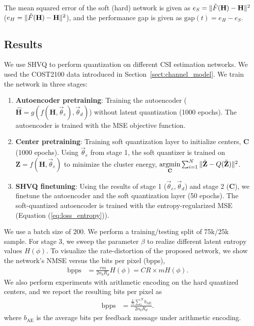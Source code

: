The mean squared error of the soft (hard) network is given as $e_S=\Arrowvert \tilde F(\mathbf H) - \mathbf H\Arrowvert^2$ ($e_H=\Arrowvert \hat F(\mathbf H) - \mathbf H\Arrowvert^2$), and the performance gap is given as $\text{gap}(t)=e_H - e_S$.

\subsection{Results}

We use SHVQ \cite{ref:Agustsson2017SoftToHard} to perform quantization on different CSI estimation networks. We used the COST2100 data introduced in Section~\ref{sect:channel_model}. We train the network in three stages:
\begin{enumerate}
	\item \textbf{Autoencoder pretraining}: Training the autoencoder ($\hat{\mathbf{H}}=g(f(\mathbf H, \vec\theta_e), \vec\theta_d)$) without latent quantization (1000 epochs). The autoencoder is trained with the MSE objective function.
	\item \textbf{Center pretraining}: Training soft quantization layer to initialize centers, $\mathbf C$ (1000 epochs). Using $\vec \theta_e$ from stage 1, the soft quantizer is trained on $\mathbf Z=f(\mathbf H, \vec \theta_e)$ to minimize the cluster energy, $\underset{\mathbf C}{\text{argmin}}\sum_{i=1}^N \Arrowvert \tilde{\mathbf Z} - Q(\tilde{\mathbf Z})\Arrowvert^2$.
	\item \textbf{SHVQ finetuning}: Using the results of stage 1 ($\vec\theta_e, \vec\theta_d$) and stage 2 ($\mathbf C$), we finetune the autoencoder and the soft quantization layer (50 epochs). The soft-quantized autoencoder is trained with the entropy-regularized MSE (Equation (\ref{eq:loss_entropy})).
\end{enumerate}

We use a batch size of 200. We perform a training/testing split of 75k/25k sample. For stage 3, we sweep the parameter $\beta$ to realize different latent entropy values $H(\phi)$. To visualize the rate-distortion of the proposed network, we show the network's NMSE versus the bits per pixel (bpps), 
\begin{align*}
	\text{bpps}	 &= \frac{rm}{2 n_{b}R_{d}}H(\phi) = CR\times mH(\phi). %
\end{align*}
We also perform experiments with arithmetic encoding on the hard quantized centers, and we report the resulting bits per pixel as
\begin{align*}
	\text{bpps}	 &= \frac{\frac 1N \sum_{i}^N b_{\text{AE}}}{2 n_{b}R_{d}}. %
\end{align*}
where $b_{\text{AE}}$ is the average bits per feedback message under arithmetic encoding.

